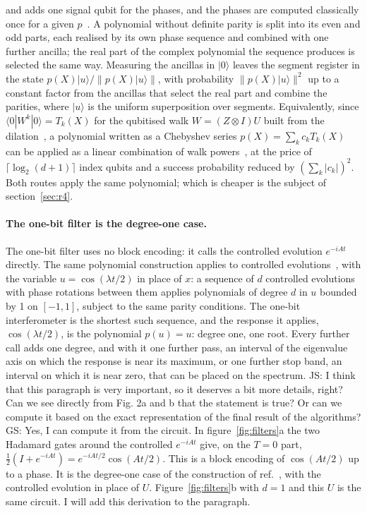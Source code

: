 \documentclass[11pt,a4paper]{article}
\newcommand{\js}[1]{{\color{blue} JS: #1 }}
\newcommand{\gs}[1]{{\color{orange!85!black} GS: #1 }}
\begin{document}
and adds one signal qubit for the phases, and the phases are computed classically once for a given
$p$~\cite{dong2021}. A polynomial without definite parity is split into its even and odd parts, each
realised by its own phase sequence and combined with one further ancilla; the real part of the
complex polynomial the sequence produces is selected the same way. Measuring the ancillas in
$|0\rangle$ leaves the segment register in the state $p(X)|u\rangle/\lVert p(X)|u\rangle\rVert$, with
probability $\lVert p(X)|u\rangle\rVert^2$ up to a constant factor from the ancillas that select the
real part and combine the parities, where $|u\rangle$ is the uniform superposition over segments. Equivalently, since $\langle0|W^k|0\rangle=T_k(X)$ for the qubitised walk $W=(Z\otimes I)U$
built from the dilation~\cite{lowchuang2019}, a polynomial written as a Chebyshev series
$p(X)=\sum_kc_kT_k(X)$ can be applied as a linear combination of walk powers~\cite{childs2012}, at the
price of $\lceil\log_2(d+1)\rceil$ index qubits and a success probability reduced by
$(\sum_k|c_k|)^2$. Both routes apply the same polynomial; which is cheaper is the subject of
section~\ref{sec:r4}.

\paragraph{The one-bit filter is the degree-one case.}
The one-bit filter uses no block encoding: it calls the controlled evolution $e^{-iAt}$ directly.
The same polynomial construction applies to controlled evolutions~\cite{dong2022}, with the
variable $u=\cos(\lambda t/2)$ in place of $x$: a sequence of $d$ controlled evolutions with phase
rotations between them applies polynomials of degree $d$ in $u$ bounded by 1 on $[-1,1]$, subject to the same parity
conditions. The one-bit
interferometer is the shortest such sequence, and the response it applies, $\cos(\lambda t/2)$, is
the polynomial $p(u)=u$: degree one, one root. Every further call adds one degree, and with it one further pass, an interval of the eigenvalue
axis on which the response is near its maximum, or one further stop band, an interval on which it is
near zero, that can be placed on the spectrum. \js{I think that this paragraph is very important, so it deserves a bit more details, right? Can we see directly from Fig. 2a and b that the statement is true? Or can we compute it based on the exact representation of the final result of the algorithms?} \gs{Yes, I can compute it from the circuit. In figure~\ref{fig:filters}a the two Hadamard gates around the controlled $e^{-iAt}$ give, on the $T=0$ part, $\tfrac12(I+e^{-iAt})=e^{-iAt/2}\cos(At/2)$. This is a block encoding of $\cos(At/2)$ up to a phase. It is the degree-one case of the construction of ref.~\cite{dong2022}, with the controlled evolution in place of $U$. Figure~\ref{fig:filters}b with $d=1$ and this $U$ is the same circuit. I will add this derivation to the paragraph.} 
\end{document}
